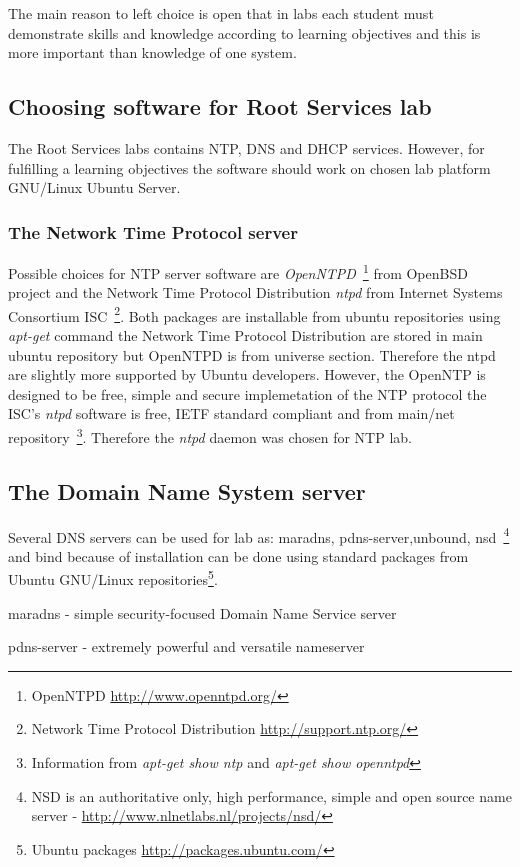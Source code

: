 The main reason to left choice is open that in labs each student must demonstrate skills and knowledge according to learning objectives and this is more important than knowledge of one system.

\subsection{Choosing software for Root Services lab}
The Root Services labs contains \gls{NTP}, \gls{DNS} and \gls{DHCP} services. However, for fulfilling a learning objectives the software should work on chosen lab platform GNU/Linux Ubuntu Server. 
\subsubsection{The Network Time Protocol server}
Possible choices for \gls{NTP} server software are \emph{OpenNTPD}~\footnote{OpenNTPD \url{http://www.openntpd.org/}
} from OpenBSD  project and the Network Time Protocol Distribution \emph{ntpd} from  Internet Systems Consortium \gls{ISC}~\footnote{Network Time Protocol Distribution \url{http://support.ntp.org/}}. Both packages are installable from ubuntu repositories using \emph{apt-get} command the Network Time Protocol Distribution are stored in main ubuntu repository but OpenNTPD is from universe section. Therefore the \gls{ntpd} are slightly more supported by Ubuntu developers.
However, the OpenNTP is designed to be free, simple and secure implemetation of the \gls{NTP} protocol the \gls{ISC}'s \emph{ntpd} software is free, \gls{IETF} standard compliant and from main/net repository~\footnote{Information from \emph{apt-get show ntp} and \emph{apt-get show openntpd}}. Therefore the \emph{ntpd} daemon was chosen for \gls{NTP} lab.
\subsection{The Domain Name System server}
Several \gls{DNS} servers can be used for lab as: maradns, pdns-server,unbound, nsd~\footnote{NSD is an authoritative only, high performance, simple and open source name server - \url{http://www.nlnetlabs.nl/projects/nsd/}} and bind because of installation can be done using standard packages from Ubuntu GNU/Linux repositories\footnote{Ubuntu packages \url{http://packages.ubuntu.com/}}.

maradns - simple security-focused Domain Name Service server

pdns-server - extremely powerful and versatile nameserver

